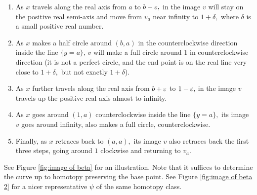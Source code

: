 \documentclass{article}
\begin{document}
\begin{enumerate}
    \item As $x$ travels along the real axis from $a$ to $b-\varepsilon,$ in the image $v$ will stay on the positive real semi-axis and move from $v_a$ near infinity to $1+\delta,$ where $\delta$ is a small positive real number.
    \item As $x$ makes a half circle around $(b,a)$ in the counterclockwise direction inside the line $\{y=a\}$, $v$ will make a full circle around $1$ in counterclockwise direction (it is not a perfect circle, and the end point is on the real line very close to $1+\delta,$ but not exactly $1+\delta$).
    \item As $x$ further travels along the real axis from $b+\varepsilon$ to $1-\varepsilon,$ in the image $v$ travels up the positive real axis almost to infinity.
    \item As $x$ goes around $(1,a)$ counterclockwise inside the line $\{y=a\},$ its image $v$ goes around infinity, also makes a full circle, counterclockwise.
    \item Finally, as $x$ retraces back to $(a,a),$ its image $v$ also retraces back the first three steps, going around $1$ clockwise and returning to $v_a.$
\end{enumerate}



See Figure \ref{fig:image of beta} for an illustration. Note that it suffices to determine the curve up to homotopy preserving the base point. See Figure \ref{fig:image of beta 2} for a nicer representative $\psi$ of the same homotopy class. 
\end{document}
